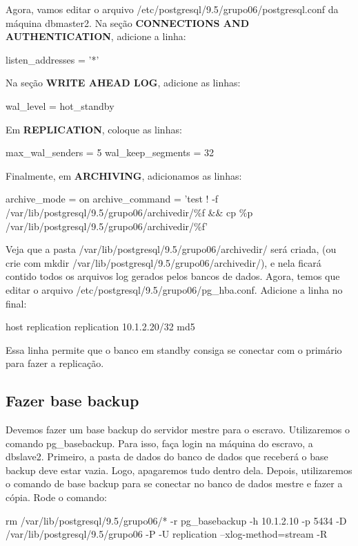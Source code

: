 \documentclass[a4paper,10pt]{article}
\begin{document}
      Agora, vamos editar o arquivo /etc/postgresql/9.5/grupo06/postgresql.conf da máquina dbmaster2.
      Na seção \textbf{CONNECTIONS AND AUTHENTICATION}, adicione a linha:
          \begin{spverbatim}
              listen_addresses = '*'
          \end{spverbatim}

      Na seção \textbf{WRITE AHEAD LOG}, adicione as linhas:
          \begin{spverbatim}
              wal_level = hot_standby
          \end{spverbatim}

      Em \textbf{REPLICATION}, coloque as linhas:
          \begin{spverbatim}
              max_wal_senders = 5
              wal_keep_segments = 32
          \end{spverbatim}

      Finalmente, em \textbf{ARCHIVING}, adicionamos as linhas:
          \begin{spverbatim}
              archive_mode = on
              archive_command = 'test ! -f /var/lib/postgresql/9.5/grupo06/archivedir/\%f && cp \%p /var/lib/postgresql/9.5/grupo06/archivedir/\%f'
          \end{spverbatim}
      Veja que a pasta /var/lib/postgresql/9.5/grupo06/archivedir/ será criada, (ou crie com mkdir /var/lib/postgresql/9.5/grupo06/archivedir/), e nela ficará contido todos os arquivos log gerados pelos bancos de dados.
      Agora, temos que editar o arquivo /etc/postgresql/9.5/grupo06/pg\_hba.conf. Adicione a linha no final:
          \begin{spverbatim}
              host    replication     replication     10.1.2.20/32    md5
          \end{spverbatim}

          Essa linha permite que o banco em standby consiga se conectar com o primário para fazer a replicação.
    \subsection{Fazer base backup}
        Devemos fazer um base backup do servidor mestre para o escravo. Utilizaremos o comando pg\_basebackup.
        Para isso, faça login na máquina do escravo, a dbslave2.
        Primeiro, a pasta de dados do banco de dados que receberá o base backup deve estar vazia. Logo, apagaremos tudo dentro dela. Depois, utilizaremos o comando de base backup para se conectar no banco de dados mestre e fazer a cópia.
        Rode o comando:
          \begin{spverbatim}
              rm /var/lib/postgresql/9.5/grupo06/* -r
              pg_basebackup -h 10.1.2.10 -p 5434 -D /var/lib/postgresql/9.5/grupo06 -P -U replication --xlog-method=stream -R
          \end{spverbatim}
\end{document}
